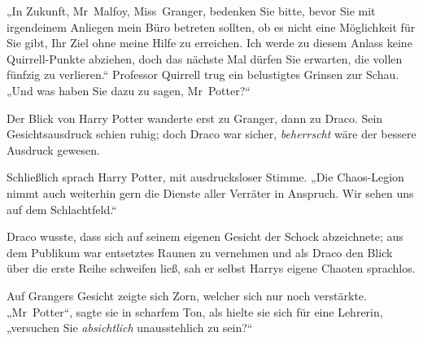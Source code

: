 „In Zukunft, Mr~Malfoy, Miss~Granger, bedenken Sie bitte, bevor Sie mit irgendeinem Anliegen mein Büro betreten sollten, ob es nicht eine Möglichkeit für Sie gibt, Ihr Ziel ohne meine Hilfe zu erreichen. Ich werde zu diesem Anlass keine Quirrell-Punkte abziehen, doch das nächste Mal dürfen Sie erwarten, die vollen fünfzig zu verlieren.“ Professor Quirrell trug ein belustigtes Grinsen zur Schau. „Und was haben Sie dazu zu sagen, Mr~Potter?“

Der Blick von Harry Potter wanderte erst zu Granger, dann zu Draco. Sein Gesichtsausdruck schien ruhig; doch Draco war sicher, \emph{beherrscht} wäre der bessere Ausdruck gewesen.

Schließlich sprach Harry Potter, mit ausdrucksloser Stimme. „Die Chaos-Legion nimmt auch weiterhin gern die Dienste aller Verräter in Anspruch. Wir sehen uns auf dem Schlachtfeld.“

Draco wusste, dass sich auf seinem eigenen Gesicht der Schock abzeichnete; aus dem Publikum war entsetztes Raunen zu vernehmen und als Draco den Blick über die erste Reihe schweifen ließ, sah er selbst Harrys eigene Chaoten sprachlos.

Auf Grangers Gesicht zeigte sich Zorn, welcher sich nur noch verstärkte. „Mr~Potter“, sagte sie in scharfem Ton, als hielte sie sich für eine Lehrerin, „versuchen Sie \emph{absichtlich} unausstehlich zu sein?“

